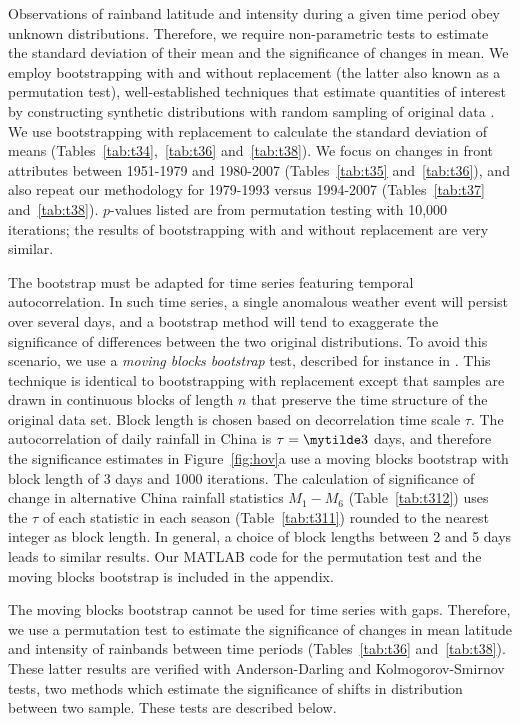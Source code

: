 \documentclass{ametsoc}
\begin{document}
	Observations of rainband latitude and intensity during a given time period obey unknown distributions. Therefore, we require non-parametric tests to estimate the standard deviation of their mean and the significance of changes in mean. We employ bootstrapping with and without replacement (the latter also known as a permutation test), well-established techniques that estimate quantities of interest by constructing synthetic distributions with random sampling of original data \citep{Good2005}. We use bootstrapping with replacement to calculate the standard deviation of means (Tables~\ref{tab:t34},~\ref{tab:t36} and~\ref{tab:t38}). We focus on changes in front attributes between 1951-1979 and 1980-2007 (Tables~\ref{tab:t35} and~\ref{tab:t36}), and also repeat our methodology for 1979-1993 versus 1994-2007 (Tables~\ref{tab:t37} and~\ref{tab:t38}). $p$-values listed are from permutation testing with 10,000 iterations; the results of bootstrapping with and without replacement are very similar.
	
	The bootstrap must be adapted for time series featuring temporal autocorrelation. In such time series, a single anomalous weather event will persist over several days, and a bootstrap method will tend to exaggerate the significance of differences between the two original distributions. To avoid this scenario, we use a \textit{moving blocks bootstrap} test, described for instance in \citet{Singh2014}. This technique is identical to bootstrapping with replacement except that samples are drawn in continuous blocks of length $n$ that preserve the time structure of the original data set. Block length is chosen based on decorrelation time scale $\tau$. The autocorrelation of daily rainfall in China is $\tau =\mytilde 3$ days, and therefore the significance estimates in Figure~\ref{fig:hov}a use a moving blocks bootstrap with block length of 3 days and 1000 iterations. The calculation of significance of change in alternative China rainfall statistics $M_1-M_6$ (Table~\ref{tab:t312}) uses the $\tau$ of each statistic in each season (Table~\ref{tab:t311}) rounded to the nearest integer as block length. In general, a choice of block lengths between 2 and 5 days leads to similar results. Our MATLAB code for the permutation test and the moving blocks bootstrap is included in the appendix.
	
	The moving blocks bootstrap cannot be used for time series with gaps. Therefore, we use a permutation test to estimate the significance of changes in mean latitude and intensity of rainbands between time periods (Tables~\ref{tab:t36} and~\ref{tab:t38}). These latter results are verified with Anderson-Darling and Kolmogorov-Smirnov tests, two methods which estimate the significance of shifts in distribution between two sample. These tests are described below.
\end{document}

